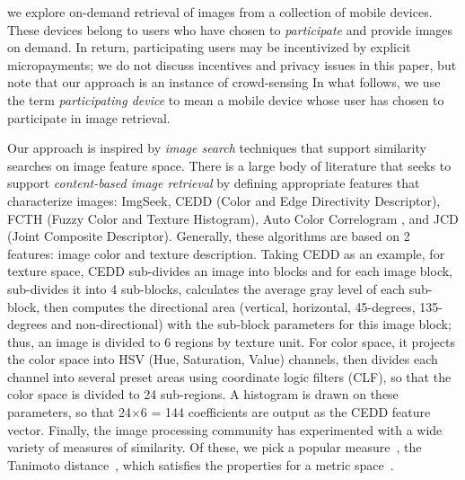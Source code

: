 %
we explore on-demand retrieval of
images from a collection of mobile devices.
%
These devices belong to users who have chosen to \emph{participate}
and provide images on demand.
%
In return, participating users may be incentivized by explicit
micropayments; we do not discuss incentives and privacy issues in this
paper, but note that our approach is an instance of crowd-sensing
%
In what follows, we use the term \emph{participating device} to mean a
mobile device whose user has chosen to participate in image retrieval.

Our approach is inspired by \emph{image search} techniques that
support similarity searches on image feature space.
%
There is a large body of literature that seeks to support
\emph{content-based image retrieval} by defining appropriate
features that characterize images: ImgSeek\cite{imgseek}, CEDD
\cite{cedd} (Color and Edge Directivity Descriptor), FCTH \cite{fcth}
(Fuzzy Color and Texture Histogram), Auto Color Correlogram
\cite{acc}, and JCD \cite{jcd} (Joint Composite Descriptor).
%
Generally, these algorithms are based on 2 features: image color and
texture description.
%
Taking CEDD as an example, for texture space, CEDD sub-divides an
image into blocks and for each image block, sub-divides it into 4
sub-blocks, calculates the average gray level of each sub-block, then
computes the directional area (vertical, horizontal, 45-degrees,
135-degrees and non-directional) with the sub-block parameters for this
image block; thus, an image is divided to 6 regions by texture unit.
%
For color space, it projects the color space into HSV (Hue,
Saturation, Value) channels, then divides each channel into several
preset areas using coordinate logic filters (CLF), so that the color
space is divided to 24 sub-regions.
%
A histogram is drawn on these parameters, so that 24$\times$6 =
144 coefficients  are
output as the CEDD feature vector.
%
Finally, the image processing community has  experimented with a wide
variety of measures of similarity.
%
Of these, we pick a popular measure~\cite{cedd,fcth,lire}, the
Tanimoto distance~\cite{tanimoto}, which satisfies the properties for
a metric space~\cite{proof}.

